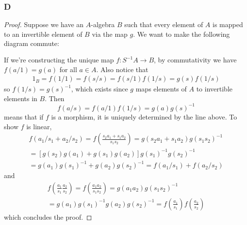 \documentclass{article}
\begin{document}
\subsubsection{D}\label{1.3.D}
\begin{proof}
    Suppose we have an $A$-algebra $B$ such that every element of $A$ is mapped to an invertible element of $B$ via the map $g$. We want to make the following diagram commute:
    \begin{center}
    \end{center}
    If we're constructing the unique map $f:S^{-1}A\to B$, by commutativity we have $f(a/1)=g(a)$ for all $a\in A$. Also notice that
    \begin{align*}
        1_B=f(1/1)=f(s/s)=f(s/1)f(1/s)=g(s)f(1/s)
    \end{align*}
    so $f(1/s)=g(s)^{-1}$, which exists since $g$ maps elements of $A$ to invertible elements in $B$. Then
    \[
    f(a/s)=f(a/1)f(1/s)=g(a)g(s)^{-1}
    \]
    means that if $f$ is a morphism, it is uniquely determined by the line above. To show $f$ is linear,
    \begin{align*}
        f(a_1/s_1+a_2/s_2)=f(\frac{s_2a_1+s_1a_2}{s_1s_2})=g(s_2a_1+s_1a_2)g(s_1s_2)^{-1}\\
        =[g(s_2)g(a_1)+g(s_1)g(a_2)]g(s_1)^{-1}g(s_2)^{-1}\\
        =g(a_1)g(s_1)^{-1}+g(a_2)g(s_2)^{-1}=f(a_1/s_1)+f(a_2/s_2)
    \end{align*}
    and
    \begin{align*}
        f(\frac{a_1}{s_1} \frac{a_2}{s_2})=f(\frac{a_1a_2}{s_1s_2})=g(a_1a_2)g(s_1s_2)^{-1}\\
        =g(a_1)g(s_1)^{-1}g(a_2)g(s_2)^{-1}=f(\frac{a_1}{s_1})f(\frac{a_2}{s_2})
    \end{align*}
    which concludes the proof.
\end{proof}
\end{document}
